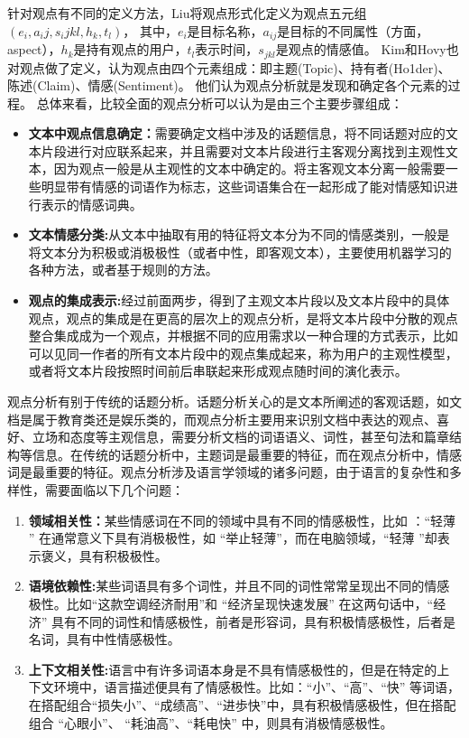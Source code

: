 针对观点有不同的定义方法，Liu将观点形式化定义为观点五元组$ (e_i,a_ij,s_ijkl,h_k,t_l)$，
其中，$ e_i $是目标名称，$ a_{ij} $是目标的不同属性（方面，aspect），$ h_k$是持有观点的用户，$ t_l$表示时间，$ s_{jkl}$是观点的情感值。
Kim和Hovy也对观点做了定义，认为观点由四个元素组成：即主题(Topic)、持有者(Ho1der)、陈述(Claim)、情感(Sentiment)。
他们认为观点分析就是发现和确定各个元素的过程。
总体来看，比较全面的观点分析可以认为是由三个主要步骤组成：
\begin{itemize}
\item \textbf{文本中观点信息确定：}需要确定文档中涉及的话题信息，将不同话题对应的文本片段进行对应联系起来，并且需要对文本片段进行主客观分离找到主观性文本，因为观点一般是从主观性的文本中确定的。将主客观文本分离一般需要一些明显带有情感的词语作为标志，这些词语集合在一起形成了能对情感知识进行表示的情感词典。
\item \textbf{文本情感分类:}从文本中抽取有用的特征将文本分为不同的情感类别，一般是将文本分为积极或消极极性（或者中性，即客观文本），主要使用机器学习的各种方法，或者基于规则的方法。
\item \textbf{观点的集成表示:}经过前面两步，得到了主观文本片段以及文本片段中的具体观点，观点的集成是在更高的层次上的观点分析，是将文本片段中分散的观点整合集成成为一个观点，并根据不同的应用需求以一种合理的方式表示，比如可以见同一作者的所有文本片段中的观点集成起来，称为用户的主观性模型，或者将文本片段按照时间前后串联起来形成观点随时间的演化表示。
\end{itemize}

观点分析有别于传统的话题分析。话题分析关心的是文本所阐述的客观话题，如文档是属于教育类还是娱乐类的，而观点分析主要用来识别文档中表达的观点、喜好、立场和态度等主观信息，需要分析文档的词语语义、词性，甚至句法和篇章结构等信息。在传统的话题分析中，主题词是最重要的特征，而在观点分析中，情感词是最重要的特征。观点分析涉及语言学领域的诸多问题，由于语言的复杂性和多样性，需要面临以下几个问题：

\begin{enumerate}
\item \textbf{领域相关性：}某些情感词在不同的领域中具有不同的情感极性，比如 ：``轻薄 '' 在通常意义下具有消极极性，如 ``举止轻薄''，而在电脑领域，``轻薄 ''却表示褒义，具有积极极性。
\item \textbf{语境依赖性:}某些词语具有多个词性，并且不同的词性常常呈现出不同的情感极性。比如``这款空调经济耐用''和 ``经济呈现快速发展'' 在这两句话中，``经济'' 具有不同的词性和情感极性，前者是形容词，具有积极情感极性，后者是名词，具有中性情感极性。
\item \textbf{上下文相关性:}语言中有许多词语本身是不具有情感极性的，但是在特定的上下文环境中，语言描述便具有了情感极性。比如：``小''、``高''、``快'' 等词语，在搭配组合``损失小''、``成绩高''、``进歩快''中，具有积极情感极性，但在搭配组合 ``心眼小''、 ``耗油高''、``耗电快'' 中，则具有消极情感极性。
\end{enumerate}

